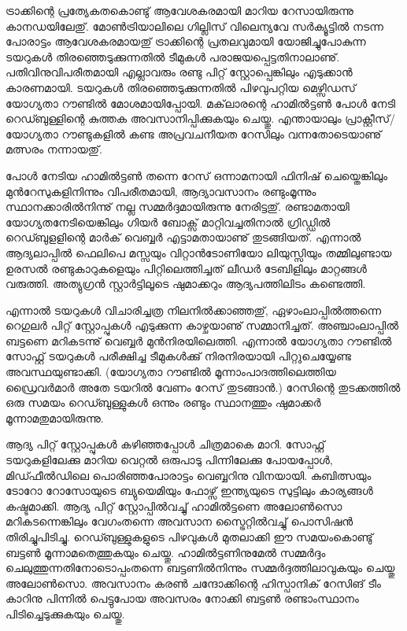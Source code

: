 ﻿
\vskip 2pt

ട്രാക്കിന്റെ പ്രത്യേകതകൊണ്ടു് ആവേശകരമായി മാറിയ റേസായിരുന്നു കാനഡയിലേതു്. മോണ്‍ട്രിയാലിലെ ഗില്ലിസ് 
വിലെന്യവേ സര്‍ക്യൂട്ടില്‍ നടന്ന പോരാട്ടം ആവേശകരമായതു് ട്രാക്കിന്റെ പ്രതലവുമായി യോജിച്ചുപോകുന്ന ടയറുകള്‍ 
തിരഞ്ഞെടുക്കുന്നതില്‍ ടീമുകള്‍ പരാജയപ്പെട്ടതിനാലാണു്. പതിവിനുവിപരീതമായി എല്ലാവരും രണ്ടു പിറ്റ് 
സ്റ്റോപ്പെങ്കിലും എടുക്കാന്‍ കാരണമായി. ടയറുകള്‍ തിരഞ്ഞെടുക്കുന്നതില്‍ പിഴവുപറ്റിയ മെഴ്സിഡസ് യോഗ്യതാ റൗണ്ടില്‍ 
മോ​ശമായിപ്പോയി. മക്‌ലാരന്റെ ഹാമില്‍ട്ടണ്‍ പോള്‍ നേടി റെഡ്ബുള്ളിന്റെ കുത്തക അവസാനിപ്പിക്കുകയും ചെയ്തു. 
എന്തായാലും പ്രാക്റ്റീസ്/യോഗ്യതാ റൗണ്ടുകളില്‍ കണ്ട അപ്രവചനീയത റേസിലും വന്നതോടെയാണു് മത്സരം നന്നായതു്.

പോള്‍ നേടിയ ഹാമില്‍ട്ടണ്‍ തന്നെ റേസ് ഒന്നാമനായി ഫിനിഷ് ചെയ്തെങ്കിലും മുന്‍റേസുകളിനിന്നും വിപരീതമായി,
ആദ്യാവസാനം രണ്ടുംമൂന്നും സ്ഥാനക്കാരില്‍നിന്നു് നല്ല സമ്മര്‍ദ്ദമായിരുന്നു നേരിട്ടതു്. രണ്ടാമതായി യോഗ്യതനേടിയെങ്കിലും
ഗിയര്‍ ബോക്സ് മാറ്റിവച്ചതിനാല്‍ ഗ്രിഡ്ഡില്‍ റെഡ്ബുളളിന്റെ മാര്‍ക് വെബ്ബര്‍ എട്ടാമതായാണു് തുടങ്ങിയത്. എന്നാല്‍ 
ആദ്യലാപ്പില്‍ ഫെലിപെ മസ്സയും വിറ്റാന്‍ടോണിയോ ലിയുസ്സിയും തമ്മിലുണ്ടായ ഉരസല്‍ രണ്ടുകാറുകളെയും 
പിറ്റിലെത്തിച്ചത് ലീഡര്‍ ടേബിളിലും മാറ്റങ്ങള്‍ വരുത്തി. അത്യുഗ്രന്‍ സ്റ്റാര്‍ട്ടിലൂടെ ഷുമാക്കറും ആദ്യപത്തിലിടം കണ്ടെത്തി.

എന്നാല്‍ ടയറുകള്‍ വിചാരിച്ചത്ര നിലനില്‍ക്കാഞ്ഞതു്, ഏഴാംലാപ്പില്‍ത്തന്നെ റെഗുലര്‍ പിറ്റ് സ്റ്റോപ്പുകള്‍ എടുക്കുന്ന 
കാഴ്ചയാണു് സമ്മാനിച്ചത്. അഞ്ചാംലാപ്പില്‍ ബട്ടണെ മറികടന്നു് വെബ്ബര്‍ മുന്‍നിരയിലെത്തി. എന്നാല്‍ യോഗ്യതാ 
റൗണ്ടില്‍ സോഫ്റ്റ് ടയറുകള്‍ പരീക്ഷിച്ച ടീമുകള്‍ക്കു് നിരനിരയായി പിറ്റുചെയ്യേണ്ട അവസ്ഥയുണ്ടാക്കി. (യോഗ്യതാ 
റൗണ്ടില്‍ മൂന്നാംപാദത്തിലെത്തിയ ഡ്രൈവര്‍മാര്‍ അതേ ടയറില്‍ വേണം റേസ് തുടങ്ങാന്‍.) റേസിന്റെ തുടക്കത്തില്‍ 
ഒരു സമയം റെഡ്ബുള്ളുകള്‍ ഒന്നും രണ്ടും സ്ഥാനത്തും ഷുമാക്കര്‍ മൂന്നാമതുമായിരുന്നു.

ആദ്യ പിറ്റ് സ്റ്റോപ്പുകള്‍ കഴിഞ്ഞപ്പോള്‍ ചിത്രമാകെ മാറി. സോഫ്റ്റ് ടയറുകളിലേക്കു മാറിയ വെറ്റല്‍ ഒരുപാടു പിന്നിലേക്കു 
പോയപ്പോള്‍, മിഡ്ഫീല്‍ഡിലെ പൊരിഞ്ഞപോരാട്ടം വെബ്ബറിനു വിനയായി. കുബിത്സയും ടോറോ റോസോയുടെ 
ബ്യുയെമിയും ഫോഴ്സ് ഇന്ത്യയുടെ സുട്ടിലും കാര്യങ്ങള്‍ കഷ്ടമാക്കി. ആദ്യ പിറ്റ് സ്റ്റോപ്പില്‍വച്ചു് ഹാമില്‍ട്ടണെ അലോണ്‍സൊ 
മറികടന്നെങ്കിലും വേഗംതന്നെ അവസാന സ്ട്രൈറ്റില്‍വച്ചു് പൊസിഷന്‍ തിരിച്ചുപിടിച്ചു. റെഡ്ബുള്ളുകളുടെ പിഴവുകള്‍ 
മുതലാക്കി ഈ സമയംകൊണ്ടു് ബട്ടണ്‍ മൂന്നാമതെത്തുകയും ചെയ്തു. ഹാമില്‍ട്ടണിനുമേല്‍ സമ്മര്‍ദ്ദം 
ചെലുത്തുന്നതിനോടൊപ്പംതന്നെ ബട്ടണില്‍നിന്നും സമ്മര്‍ദ്ദത്തിലാവുകയും ചെയ്തു അലോണ്‍സൊ. അവസാനം 
കരണ്‍ ചന്ദോക്കിന്റെ ഹിസ്പാനിക് റേസിങ് ടീം കാറിനു പിന്നില്‍ പെട്ടുപോയ അവസരം നോക്കി ബട്ടണ്‍ രണ്ടാംസ്ഥാനം 
പിടിച്ചെടുക്കുകയും ചെയ്തു.

